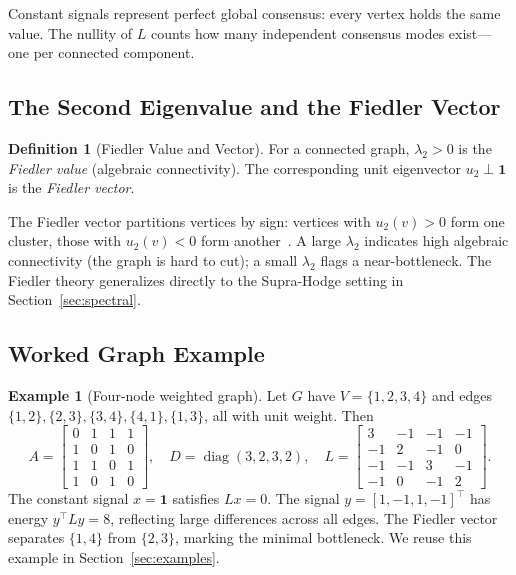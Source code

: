 \documentclass[11pt]{article}
\theoremstyle{definition}
\newtheorem{definition}[theorem]{Definition}
\newtheorem{example}[theorem]{Example}
\theoremstyle{remark}
\DeclareMathOperator{\diag}{diag}
\begin{document}
Constant signals represent perfect global consensus: every vertex holds the
same value. The nullity of $L$ counts how many independent consensus modes
exist---one per connected component.

\subsection{The Second Eigenvalue and the Fiedler Vector}

\begin{definition}[Fiedler Value and Vector]
For a connected graph, $\lambda_2 > 0$ is the \emph{Fiedler value} (algebraic
connectivity). The corresponding unit eigenvector $u_2 \perp \mathbf{1}$ is the
\emph{Fiedler vector}.
\end{definition}

The Fiedler vector partitions vertices by sign: vertices with $u_2(v)>0$ form
one cluster, those with $u_2(v)<0$ form another~\cite{chung1997}. A large
$\lambda_2$ indicates high algebraic connectivity (the graph is hard to cut);
a small $\lambda_2$ flags a near-bottleneck. The Fiedler theory generalizes
directly to the Supra-Hodge setting in Section~\ref{sec:spectral}.

\subsection{Worked Graph Example}

\begin{example}[Four-node weighted graph]
\label{ex:4node}
Let $G$ have $V=\{1,2,3,4\}$ and edges $\{1,2\},\{2,3\},\{3,4\},\{4,1\},\{1,3\}$,
all with unit weight. Then
\[
  A = \begin{bmatrix} 0&1&1&1\\1&0&1&0\\1&1&0&1\\1&0&1&0 \end{bmatrix},\quad
  D = \diag(3,2,3,2),\quad
  L = \begin{bmatrix} 3&-1&-1&-1\\-1&2&-1&0\\-1&-1&3&-1\\-1&0&-1&2 \end{bmatrix}.
\]
The constant signal $x=\mathbf{1}$ satisfies $Lx=0$. The signal
$y=[1,-1,1,-1]^\top$ has energy $y^\top Ly = 8$, reflecting large differences
across all edges. The Fiedler vector separates $\{1,4\}$ from $\{2,3\}$,
marking the minimal bottleneck. We reuse this example in
Section~\ref{sec:examples}.
\end{example}
\end{document}
